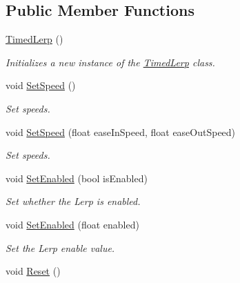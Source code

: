 \subsection*{Public Member Functions}
\begin{DoxyCompactItemize}
\item 
\hyperlink{class_microsoft_1_1_samples_1_1_kinect_1_1_avateering_1_1_filters_1_1_timed_lerp_a2fb853bc9258623a8661f0ce980d8482}{Timed\+Lerp} ()
\begin{DoxyCompactList}\small\item\em Initializes a new instance of the \hyperlink{class_microsoft_1_1_samples_1_1_kinect_1_1_avateering_1_1_filters_1_1_timed_lerp}{Timed\+Lerp} class. \end{DoxyCompactList}\item 
void \hyperlink{class_microsoft_1_1_samples_1_1_kinect_1_1_avateering_1_1_filters_1_1_timed_lerp_a7b000562840aed3cb22da5305887c75f}{Set\+Speed} ()
\begin{DoxyCompactList}\small\item\em Set speeds. \end{DoxyCompactList}\item 
void \hyperlink{class_microsoft_1_1_samples_1_1_kinect_1_1_avateering_1_1_filters_1_1_timed_lerp_a8c7da8003befabf88f27664f620edcc1}{Set\+Speed} (float ease\+In\+Speed, float ease\+Out\+Speed)
\begin{DoxyCompactList}\small\item\em Set speeds. \end{DoxyCompactList}\item 
void \hyperlink{class_microsoft_1_1_samples_1_1_kinect_1_1_avateering_1_1_filters_1_1_timed_lerp_a9528c6e4965ee4613ee2078369cea2e7}{Set\+Enabled} (bool is\+Enabled)
\begin{DoxyCompactList}\small\item\em Set whether the Lerp is enabled. \end{DoxyCompactList}\item 
void \hyperlink{class_microsoft_1_1_samples_1_1_kinect_1_1_avateering_1_1_filters_1_1_timed_lerp_a4f6ccd18411293b7713d22fed18c6cef}{Set\+Enabled} (float enabled)
\begin{DoxyCompactList}\small\item\em Set the Lerp enable value. \end{DoxyCompactList}\item 
void \hyperlink{class_microsoft_1_1_samples_1_1_kinect_1_1_avateering_1_1_filters_1_1_timed_lerp_a66bc729b694f75f320315d7fe374d4c8}{Reset} ()

\end{DoxyCompactItemize}
